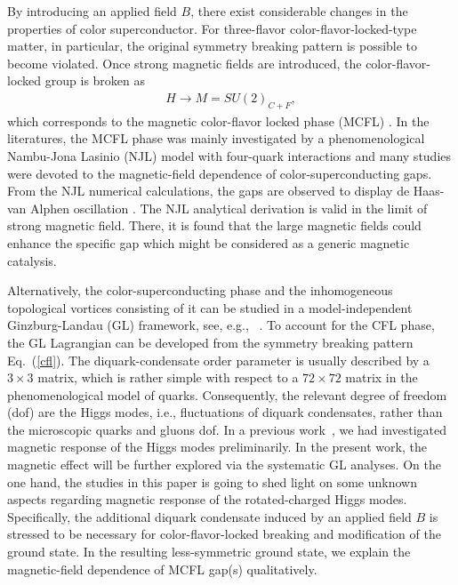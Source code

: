 \documentclass[prd, showpacs,nofootinbib,amsmath,amssymb]{revtex4}
\begin{document}
By introducing an applied field $B$, there exist considerable changes in the properties of color
superconductor. For three-flavor color-flavor-locked-type matter, in particular, the original symmetry
breaking pattern is possible to become violated. Once strong magnetic fields are introduced, the
color-flavor-locked group is broken as
\begin{eqnarray}
H\rightarrow M=SU(2)_{C+F},\label{cfl2}\end{eqnarray}
which corresponds to the magnetic color-flavor locked phase
(MCFL) \cite{ferrer2005magnetic,fukushima2008color,ferrer2006color,ferrer2007magnetic}.
In the literatures, the MCFL phase was mainly investigated by a phenomenological Nambu-Jona Lasinio (NJL)
model with four-quark interactions and many studies were devoted to the magnetic-field dependence of
color-superconducting gaps.
From the NJL numerical calculations, the gaps are observed to display de Haas-van Alphen
oscillation \cite{ferrer2005magnetic,fukushima2008color}.
The NJL analytical derivation is valid in the limit of strong magnetic field. There, it is found that
the large magnetic fields could enhance the specific gap \cite{ferrer2006color,sen2015anisotropic} which
might be considered as a generic magnetic catalysis.

Alternatively, the color-superconducting phase and the inhomogeneous topological vortices consisting of it can be studied in a model-independent Ginzburg-Landau (GL) framework, see, e.g., ~\cite{giannakis2002ginzburg,iida2002superfluid,balachandran2006semisuperfluid,nakano2008non,eto2014vortices}.
To account for the CFL phase, the GL Lagrangian can be developed from the symmetry breaking pattern Eq.~(\ref{cfl}).
The diquark-condensate order parameter is usually described by a $3\times3$ matrix, which is rather simple with
respect to a $72 \times 72$ matrix in the phenomenological model of quarks. Consequently, the relevant degree
of freedom (dof) are the Higgs modes, i.e., fluctuations of diquark condensates, rather than the microscopic
quarks and gluons dof. In a previous work~\cite{zhang2015magnetic}, we had investigated magnetic response of the Higgs modes 
preliminarily. In the present work, the magnetic effect will be further explored via the systematic GL analyses. 
On the one hand, the studies in this paper is going to shed light on some unknown aspects regarding magnetic response of the rotated-charged Higgs modes.
Specifically, the additional diquark condensate induced by an applied field $B$ is stressed to be necessary for color-flavor-locked breaking and modification of the ground state. In the resulting less-symmetric ground state, we explain the magnetic-field dependence of MCFL gap(s) qualitatively. 
\end{document}
